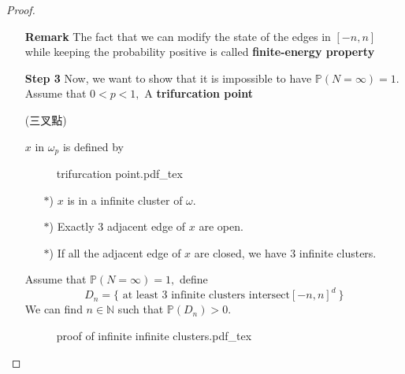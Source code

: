 \documentclass[12pt,a4paper]{report}
\theoremstyle{definition}
\newcommand{\incfig}[1]{%
{#1.pdf_tex}
}
\begin{document}
\begin{enumerate}
\begin{proof}
\begin{enumerate}
		\[	
		B_n=\{N=k \mbox{ and } k \mbox{ infinite clusters intersect } [-n,n]^d\}
		\]
		Note that there exist $n\in \mathbb{N}$ such that $\mathbb{P}(B_n)>0.$ Define 
		\[
		C_n=\{\mbox{ all infinite clusters intersect }[-n,n]^d\}
		\]
		Note that 
		\begin{enumerate}
			\item $B_n\subseteq C_n.$
			\item $B_n$ depends on the edges in $[-n,n]^d,$ but $C_n$ does not.
		\end{enumerate}
		\begin{figure}[htp]
		\centering
		\def\svgwidth{6cm}
		\incfig{intersect}
		\end{figure}
		We use $\blacksquare_n$ to be the event that all edges in $[-n,n]^d$ are open, then
		\[
		\mathbb{P}(C_n\cap\blacksquare_n)=\mathbb{P}(C_n)\mathbb{P}(\blacksquare_n)>0.
		\]
		Moreover, $C_n\cap \blacksquare_n\subseteq\{N=1\},$ we find  that $\mathbb{P}(N=1)>0\Rightarrow \mathbb{P}(N=1)=1$ (contradicts).
		\item[\textbf{Remark}] The fact that we can modify the state of the edges in $[-n,n]$ while keeping the probability positive is called \textbf{finite-energy property}
		\item[\textbf{Step 3}] Now, we want to show that it is impossible to have $\mathbb{P}(N=\infty)=1.$\\
		Assume that $0<p<1,$ A \textbf{trifurcation point} \begin{CJK}{UTF8}{bkai}(三叉點)\end{CJK}  $x$ in $\omega_p$ is defined by 
		\begin{figure}[htp]
		\centering
		\def\svgwidth{8cm}
		\incfig{trifurcation point}
		\end{figure}
		\begin{enumerate}
			\item[$*$)] $x$ is in a infinite cluster of $\omega.$
			\item[$*$)] Exactly 3 adjacent edge of $x$ are open.
			\item[$*$)] If all the adjacent edge of $x$ are closed, we have 3 infinite clusters.
		\end{enumerate}
		Assume that $\mathbb{P}(N=\infty)=1,$ define
		\[
		D_n=\{\mbox{ at least 3 infinite clusters intersect} [-n,n]^d\ \}
		\]
		We can find $n\in\mathbb{N}$ such that $\mathbb{P}(D_n)>0.$
	\newpage
		\begin{figure}[htp]
		\centering
		\def\svgwidth{8cm}
		\incfig{proof of infinite infinite clusters}
		\end{figure}

\end{enumerate}
\end{proof}
\end{enumerate}
\end{document}
